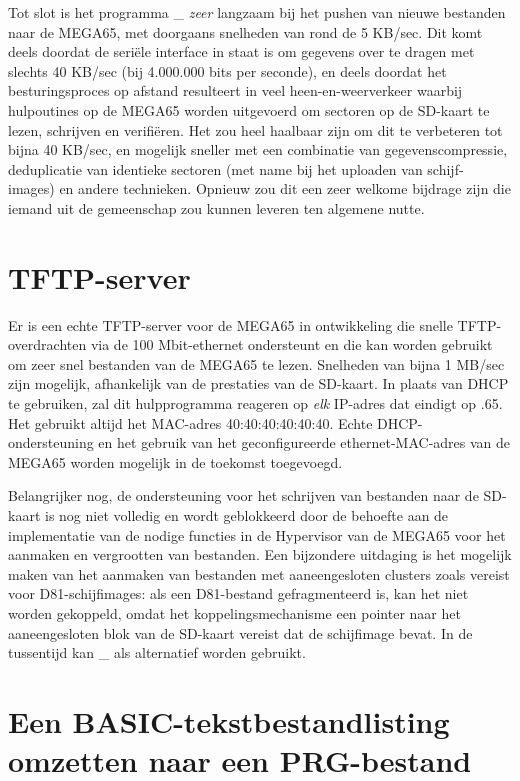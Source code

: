 Tot slot is het programma \_ {\em zeer} langzaam bij het pushen
van nieuwe bestanden naar de MEGA65, met doorgaans snelheden van rond de 5 KB/sec.
Dit komt deels doordat de seriële interface in staat is om
gegevens over te dragen met slechts 40 KB/sec (bij 4.000.000 bits per
seconde), en deels doordat het besturingsproces op afstand resulteert in
veel heen-en-weerverkeer waarbij hulpoutines op de MEGA65 worden uitgevoerd om
sectoren op de SD-kaart te lezen, schrijven en verifiëren. Het zou heel
haalbaar zijn om dit te verbeteren tot bijna 40 KB/sec, en mogelijk
sneller met een combinatie van gegevenscompressie,
deduplicatie van identieke sectoren (met name bij het uploaden van schijf-
images) en andere technieken. Opnieuw zou dit een zeer welkome bijdrage zijn die iemand uit de gemeenschap zou kunnen leveren
ten algemene nutte.

\section{TFTP-server}

Er is een echte TFTP-server voor de MEGA65 in ontwikkeling die snelle
TFTP-overdrachten via de 100 Mbit-ethernet ondersteunt en die kan worden gebruikt om
zeer snel bestanden van de MEGA65 te lezen. Snelheden van bijna 1 MB/sec
zijn mogelijk, afhankelijk van de prestaties van de SD-kaart. In plaats van
DHCP te gebruiken, zal dit hulpprogramma reageren op {\em elk} IP-adres dat eindigt op
.65. Het gebruikt altijd het MAC-adres 40:40:40:40:40:40. Echte DHCP-
ondersteuning en het gebruik van het geconfigureerde ethernet-MAC-adres van de MEGA65
worden mogelijk in de toekomst toegevoegd.

Belangrijker nog, de ondersteuning voor het schrijven van
bestanden naar de SD-kaart is nog niet volledig en wordt geblokkeerd door de behoefte
aan de implementatie van de nodige functies in de Hypervisor van de MEGA65 voor het aanmaken en
vergrootten van bestanden. Een bijzondere uitdaging is het mogelijk maken van het aanmaken van
bestanden met aaneengesloten clusters zoals vereist voor D81-schijfimages: als
een D81-bestand gefragmenteerd is, kan het niet worden gekoppeld, omdat het
koppelingsmechanisme een pointer naar het aaneengesloten blok van de
SD-kaart vereist dat de schijfimage bevat.
In de tussentijd kan \_ als alternatief worden gebruikt.

\section{Een BASIC-tekstbestandlisting omzetten naar een PRG-bestand}

